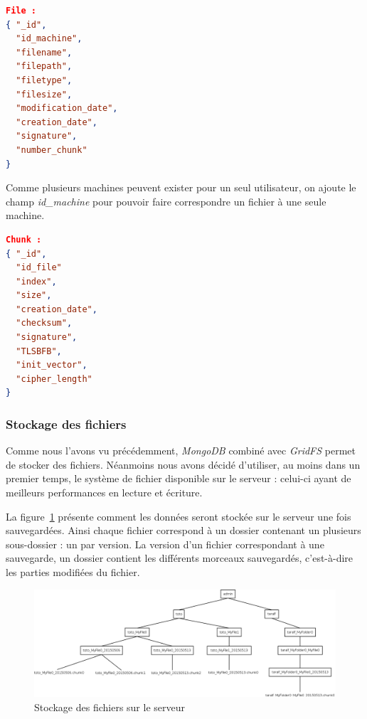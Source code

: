 \documentclass[a4paper,10pt, twoside]{report}
\begin{document}
\begin{spacing}{1.2}
\begin{lstlisting}[language=json]
File :
{ "_id",
  "id_machine",
  "filename",
  "filepath",
  "filetype",
  "filesize",
  "modification_date",
  "creation_date",
  "signature",
  "number_chunk"
}
\end{lstlisting}
Comme plusieurs machines peuvent exister pour un seul utilisateur, on ajoute
le champ \textit{id\_machine} pour pouvoir faire correspondre un fichier \`a
une seule machine.

\begin{lstlisting}[language=json]
Chunk :
{ "_id",
  "id_file"
  "index",
  "size",
  "creation_date",
  "checksum",
  "signature",
  "TLSBFB",
  "init_vector",
  "cipher_length"
}
\end{lstlisting}

\subsubsection{Stockage des fichiers}
Comme nous l'avons vu pr\'ec\'edemment, \textit{MongoDB} combin\'e avec
\textit{GridFS} permet de stocker des fichiers. N\'eanmoins nous avons
d\'ecid\'e d'utiliser, au moins dans un premier temps, le syst\`eme de fichier
disponible sur le serveur : celui-ci ayant de meilleurs performances en lecture
et \'ecriture.

La figure~\ref{fileSystemServer} pr\'esente comment les donn\'ees seront
stock\'ee sur le serveur une fois sauvegard\'ees. Ainsi chaque fichier
correspond \`a un dossier contenant un plusieurs sous-dossier : un par version.
La version d'un fichier correspondant \`a une sauvegarde, un dossier contient
les diff\'erents morceaux sauvegard\'es, c'est-\`a-dire les parties modifi\'ees
du fichier.

\begin{figure}[h!]
  \hspace{-4.5em}
  \includegraphics[width=19cm]{softwareDesign/fileSystemServer.png}
  \caption{\label{fileSystemServer} Stockage des fichiers sur le serveur}
\end{figure}


\end{spacing}
\end{document}
